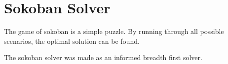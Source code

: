 \section{Sokoban Solver}

The game of sokoban is a simple puzzle.
By running through all possible scenarios, the optimal solution can be found.

The sokoban solver was made as an informed breadth first solver.